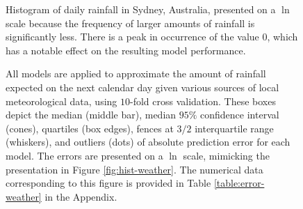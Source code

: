 \documentclass[smallextended,final]{svjour3}  %
\begin{document}
\begin{figure}
  \centering
  \caption{Histogram of daily rainfall in Sydney, Australia, presented
    on a $\ln$ scale because the frequency of larger amounts of
    rainfall is significantly less. There is a peak in occurrence of
    the value $0$, which has a notable effect on the resulting model
    performance.}
  \label{fig:hist-weather}

  \vspace{.3cm}

  \caption{All models are applied to approximate the amount of
    rainfall expected on the next calendar day given various sources
    of local meteorological data, using $10$-fold cross validation.
    These boxes depict the median (middle bar), median $95\%$
    confidence interval (cones), quartiles (box edges), fences at
    $3/2$ interquartile range (whiskers), and outliers (dots) of
    absolute prediction error for each model. The errors are presented
    on a $\ln$ scale, mimicking the presentation in Figure
    \ref{fig:hist-weather}. The numerical data corresponding to this
    figure is provided in Table \ref{table:error-weather} in the
    Appendix.}
  \label{fig:error-weather}
\end{figure}
\end{document}
